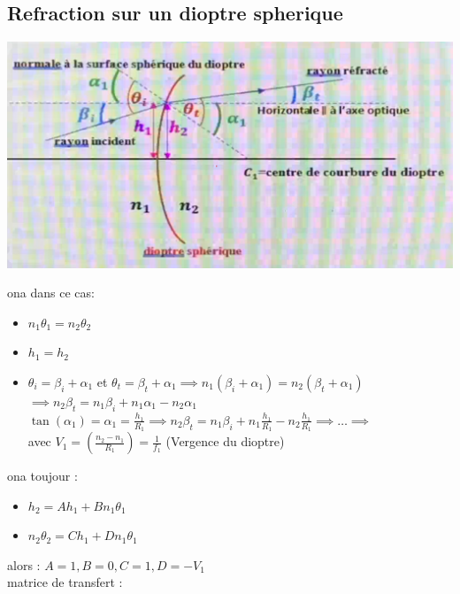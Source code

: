 \documentclass[12pt]{book}
\begin{document}
        \subsection{Refraction sur un dioptre spherique}
            \begin{center}
                \includegraphics[width = 0.6\linewidth]{pic/dioptrespherique.png}
            \end{center}
            ona dans ce cas:
            \begin{itemize}
                \item $n_1\theta_1 = n_2\theta_2$
                \item $h_1 = h_2$
                \item $\theta_i =\beta_i + \alpha_1$ et $\theta_t =\beta_t + \alpha_1 \implies n_1(\beta_i + \alpha_1) = n_2(\beta_t + \alpha_1)  $ \\ 
                      $\implies n_2\beta_t = n_1\beta_i +n_1\alpha_1 - n_2\alpha_1$ \\
                      $\tan(\alpha_1) = \alpha_1 = \frac{h_1}{R_1} \implies n_2\beta_t = n_1\beta_i +n_1\frac{h_1}{R_1} - n_2\frac{h_1}{R_1} \implies \ldots \implies $ \\
                       avec $V_1 = (\frac{n_2-n_1}{R_1}) = \frac{1}{f_1}$ (Vergence du dioptre)
            \end{itemize}
            \pagebreak
            ona toujour :
            \begin{itemize}
                \item $ h_2 = Ah_1 + Bn_1\theta_1$
                \item $ n_2\theta_2 = Ch_1 + Dn_1\theta_1$
            \end{itemize}
            alors : $ A = 1 , B = 0 ,C = 1 , D = -V_1$ \\ 
            matrice de transfert : 
            \begin{center}
                 \\
            \end{center}
        
\end{document}
